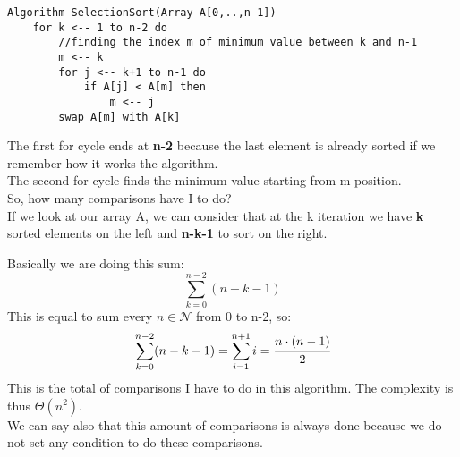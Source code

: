 \documentclass{article}
\begin{document}
\begin{lstlisting}[caption={\\\textit{Selection sort algorithm.}}]
Algorithm SelectionSort(Array A[0,..,n-1]) 
	for k <-- 1 to n-2 do
		//finding the index m of minimum value between k and n-1
		m <-- k
		for j <-- k+1 to n-1 do
			if A[j] < A[m] then
				m <-- j
		swap A[m] with A[k]
\end{lstlisting}
The first for cycle ends at \textbf{n-2} because the last element is already sorted if we remember how it works the algorithm. \\
The second for cycle finds the minimum value starting from m position.\\
So, how many comparisons have I to do?\\
If we look at our array A, we can consider that at the k iteration we have \textbf{k} sorted elements on the left and \textbf{n-k-1} to sort on the right.\\

 
 Basically we are doing this sum: \\
 $$\sum_{k=0}^{n-2}(n-k-1)$$
This is equal to sum every $n \in \mathcal{N}$ from 0 to n-2, so:\\
$$\sum_{k=0}^{n-2}(n-k-1) = \sum_{i=1}^{n+1} i = \cfrac{n \cdot (n-1)}{2}$$
This is the total of comparisons I have to do in this algorithm.
The complexity is thus $\Theta(n^2)$. \\
We can say also that this amount of comparisons is always done because we do not set any condition to do these comparisons.
\end{document}
